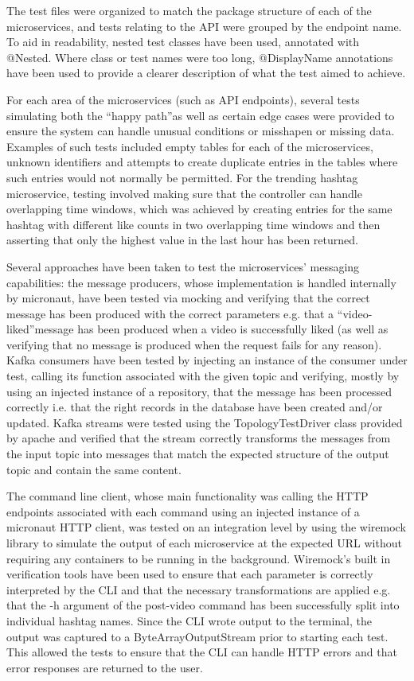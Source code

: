 \documentclass[parskip=full]{article}
\begin{document}
    The test files were organized to match the package structure of each of the microservices, and tests relating to the API were grouped by the endpoint name.
    To aid in readability, nested test classes have been used, annotated with @Nested.
    Where class or test names were too long, @DisplayName annotations have been used to provide a clearer description of what the test aimed to achieve.

    For each area of the microservices (such as API endpoints), several tests simulating both the ``happy path''as well as certain edge cases were provided to ensure the system can handle unusual conditions or misshapen or missing data.
    Examples of such tests included empty tables for each of the microservices, unknown identifiers and attempts to create duplicate entries in the tables where such entries would not normally be permitted.
    For the trending hashtag microservice, testing involved making sure that the controller can handle overlapping time windows, which was achieved by creating entries for the same hashtag with different like counts in two overlapping time windows and then asserting that only the highest value in the last hour has been returned.

    Several approaches have been taken to test the microservices' messaging capabilities: the message producers, whose implementation is handled internally by micronaut, have been tested via mocking and verifying that the correct message has been produced with the correct parameters e.g. that a ``video-liked''message has been produced when a video is successfully liked (as well as verifying that no message is produced when the request fails for any reason).
    Kafka consumers have been tested by injecting an instance of the consumer under test, calling its function associated with the given topic and verifying, mostly by using an injected instance of a repository, that the message has been processed correctly i.e. that the right records in the database have been created and/or updated.
    Kafka streams were tested using the TopologyTestDriver class provided by apache \cite{topologyTestDriver} and verified that the stream correctly transforms the messages from the input topic into messages that match the expected structure of the output topic and contain the same content.

    The command line client, whose main functionality was calling the HTTP endpoints associated with each command using an injected instance of a micronaut HTTP client, was tested on an integration level by using the wiremock \cite{wiremock} library to simulate the output of each microservice at the expected URL without requiring any containers to be running in the background.
    Wiremock's built in verification tools have been used to ensure that each parameter is correctly interpreted by the CLI and that the necessary transformations are applied e.g. that the -h argument of the post-video command has been successfully split into individual hashtag names.
    Since the CLI wrote output to the terminal, the output was captured to a ByteArrayOutputStream prior to starting each test.
    This allowed the tests to ensure that the CLI can handle HTTP errors and that error responses are returned to the user.
\end{document}
